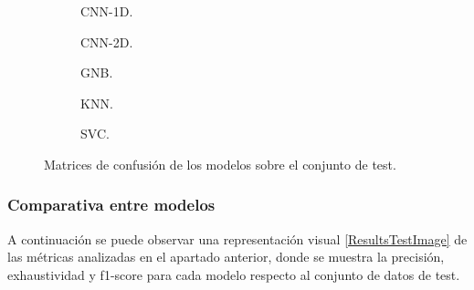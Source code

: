     \begin{figure}[H]
        \centering
        \begin{subfigure}{0.4\textwidth}
            
            \caption{CNN-1D.}
            \label{ConfusionMatrixTestImages:1D}
        \end{subfigure}
        \hspace{3em}
        \begin{subfigure}[b]{0.4\textwidth}
            
            \caption{CNN-2D.} 
            \label{ConfusionMatrixTestImages:2D}
        \end{subfigure}
        \vspace*{0.5 cm}
        \begin{subfigure}[b]{0.4\textwidth}
            
            \caption{GNB.}
            \label{ConfusionMatrixTestImages:GNB}
        \end{subfigure}
        \hspace{3em}
        \begin{subfigure}[b]{0.4\textwidth}
            
            \caption{KNN.}
            \label{ConfusionMatrixTestImages:KNN}
        \end{subfigure}
        \vspace*{0.5 cm}
        \begin{subfigure}[b]{0.4\textwidth}
            
            \caption{SVC.}
            \label{ConfusionMatrixTestImages:SVC}
        \end{subfigure}

        \caption{Matrices de confusión de los modelos sobre el conjunto de test.}
        \label{ConfusionMatrixTestImages}
     \end{figure}

  \subsubsection{Comparativa entre modelos}

    A continuación se puede observar una representación visual \eqref{ResultsTestImage} de las métricas analizadas en el apartado anterior, donde se muestra la precisión, exhaustividad y f1-score para cada modelo respecto al conjunto de datos de test.

